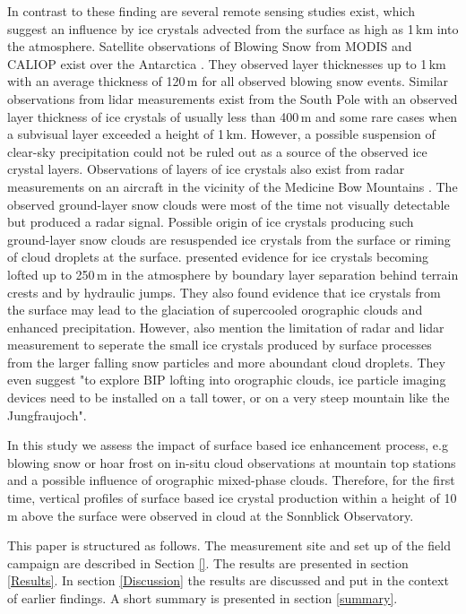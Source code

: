 \documentclass[draft,linenumbers]{agujournal}
\begin{document}
In contrast to these finding are several remote sensing studies exist, which suggest an influence by ice crystals advected from the surface as high as 1\,\si{km} into the atmosphere. Satellite observations of Blowing Snow from MODIS and CALIOP exist over the Antarctica \citep{Pal01}. They observed layer thicknesses up to 1\,\si{km} with an average thickness of 120\,\si{m} for all observed blowing snow events. Similar observations from lidar measurements exist from the South Pole with an observed layer thickness of ice crystals of usually less than 400\,\si{m} \citep{Mah03} and some rare cases when a subvisual layer exceeded a height of 1\,\si{km}. However, a possible suspension of clear-sky precipitation could not be ruled out as a source of the observed ice crystal layers. Observations of layers of ice crystals also exist from radar measurements on an aircraft in the vicinity of the Medicine Bow Mountains \citep{Val12}. The observed ground-layer snow clouds were most of the time not visually detectable but produced a radar signal. Possible origin of ice crystals producing such ground-layer snow clouds are resuspended ice crystals from the surface or riming of cloud droplets at the surface. \citet{Gee15} presented evidence for ice crystals becoming lofted up to 250\,\si{m} in the atmosphere by boundary layer separation behind terrain crests and by hydraulic jumps. They also found evidence that ice crystals from the surface may lead to the glaciation of supercooled orographic clouds and enhanced precipitation. However, \citet{Gee15} also mention the limitation of radar and lidar measurement to seperate the small ice crystals produced by surface processes from the larger falling snow particles and more aboundant cloud droplets. They even suggest "to explore BIP lofting into orographic clouds, ice particle imaging devices need to be installed on a tall tower, or on a very steep mountain like the Jungfraujoch".

In this study we assess the impact of surface based ice enhancement process, e.g blowing snow or hoar frost on in-situ cloud observations at mountain top stations and a possible influence of orographic mixed-phase clouds. Therefore, for the first time, vertical profiles of surface based ice crystal production within a height of 10\,\si{m} above the surface were observed in cloud at the Sonnblick Observatory. 

This paper is structured as follows. The measurement site and set up of the field campaign are described in Section \ref{}. The results are presented in section \ref{Results}. In section \ref{Discussion} the results are discussed and put in the context of earlier findings. A short summary is presented in section \ref{summary}. 
\end{document}

